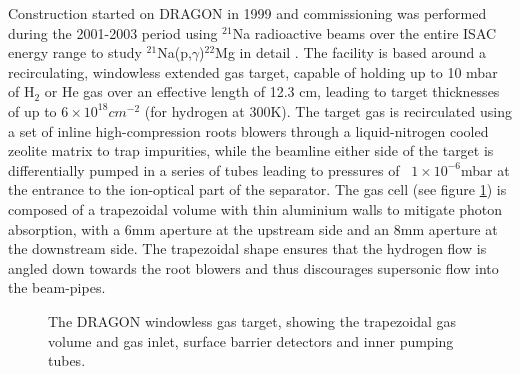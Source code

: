 Construction started on DRAGON in 1999 and commissioning was performed during the 2001-2003 period using $^{21}$Na radioactive beams over the entire ISAC energy range to study $^{21}$Na(p,$\gamma$)$^{22}$Mg in detail \cite{dau04}. The facility is based around a recirculating, windowless extended gas target, capable of holding up to 10 mbar of H$_{2}$ or He gas over an effective length of 12.3 cm, leading to target thicknesses of up to $6 \times 10^{18} cm^{-2}$ (for hydrogen at 300K). The target gas is recirculated using a set of inline high-compression roots blowers through a liquid-nitrogen cooled zeolite matrix to trap impurities, while the beamline either side of the target is differentially pumped in a series of tubes leading to pressures of ~$1\times 10^{-6}$mbar at the entrance to the ion-optical part of the separator. The gas cell (see figure \ref{fig:dra_gas_target}) is composed of a trapezoidal volume with thin aluminium walls to mitigate photon absorption, with a 6mm aperture at the upstream side and an 8mm aperture at the downstream side. The trapezoidal shape ensures that the hydrogen flow is angled down towards the root blowers and thus discourages supersonic flow into the beam-pipes. 

\begin{figure}
\caption{The DRAGON windowless gas target, showing the trapezoidal gas volume and gas inlet, surface barrier detectors and inner pumping tubes.  }
\label{fig:dra_gas_target}
\end{figure}


